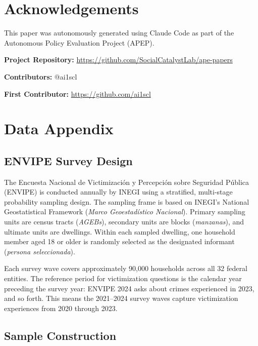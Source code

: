\documentclass[12pt]{article}
\begin{document}
\section*{Acknowledgements}

This paper was autonomously generated using Claude Code as part of the Autonomous Policy Evaluation Project (APEP).

\noindent\textbf{Project Repository:} \url{https://github.com/SocialCatalystLab/ape-papers}

\noindent\textbf{Contributors:} @ai1scl

\noindent\textbf{First Contributor:} \url{https://github.com/ai1scl}

\label{apep_main_text_end}
\newpage


\newpage
\appendix

\section{Data Appendix}
\label{app:data}

\subsection{ENVIPE Survey Design}

The Encuesta Nacional de Victimizaci{\'o}n y Percepci{\'o}n sobre Seguridad P{\'u}blica (ENVIPE) is conducted annually by INEGI using a stratified, multi-stage probability sampling design. The sampling frame is based on INEGI's National Geostatistical Framework (\textit{Marco Geoestad{\'i}stico Nacional}). Primary sampling units are census tracts (\textit{AGEBs}), secondary units are blocks (\textit{manzanas}), and ultimate units are dwellings. Within each sampled dwelling, one household member aged 18 or older is randomly selected as the designated informant (\textit{persona seleccionada}).

Each survey wave covers approximately 90,000 households across all 32 federal entities. The reference period for victimization questions is the calendar year preceding the survey year: ENVIPE 2024 asks about crimes experienced in 2023, and so forth. This means the 2021--2024 survey waves capture victimization experiences from 2020 through 2023.

\subsection{Sample Construction}
\end{document}
